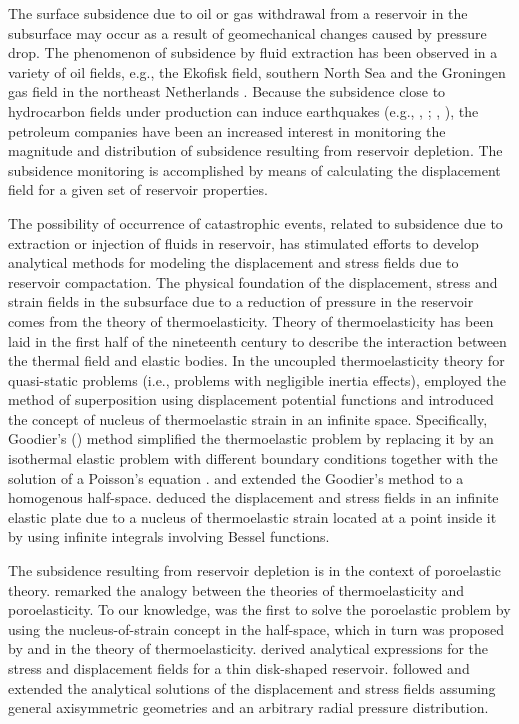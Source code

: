\documentclass[journal abbreviation, manuscript]{copernicus}
\begin{document}
\introduction  %
The surface subsidence due to oil or gas withdrawal from a reservoir in the subsurface may occur as a result of geomechanical changes caused by pressure drop.
The phenomenon of subsidence by fluid extraction  has been observed in a variety of oil fields, e.g., the Ekofisk field, southern North Sea \citep{Borges2020} and the Groningen gas field in the northeast Netherlands \citep{vanThienen-visser&Fokker17}.
Because the subsidence close to hydrocarbon fields under production can induce earthquakes (e.g., \citeauthor{Dahmetal15}, \citeyear{Dahmetal15}; \citeauthor{Grigolietal17}, \citeyear{Grigolietal17}), the petroleum companies  have been an increased interest in monitoring the magnitude and distribution of subsidence resulting from reservoir depletion.
The subsidence monitoring is accomplished by means of calculating the displacement field for a given set of  reservoir properties.

The possibility of occurrence of catastrophic events, related to subsidence due to extraction or injection of fluids in reservoir, has stimulated efforts to  develop analytical methods for modeling the displacement and stress fields due to reservoir compactation.
The physical foundation of the displacement, stress and strain fields in the subsurface due to a reduction of pressure in the reservoir comes from the theory of thermoelasticity.
Theory of thermoelasticity has been laid in the first half of the nineteenth century to describe the interaction between the thermal field and elastic bodies.
In the uncoupled thermoelasticity theory for quasi-static problems (i.e., problems with negligible inertia effects), \cite{Goodier37} employed the method of superposition using
displacement potential functions and introduced the  concept of nucleus of thermoelastic strain in an infinite space.
Specifically, Goodier’s (\citeyear{Goodier37}) method simplified the thermoelastic problem by replacing it by an isothermal elastic problem with different boundary conditions together with the solution of a Poisson’s equation \citep{Tao71}. 
\cite{Mindlin&Cheng50} and \cite{Sen51} extended the Goodier's method to a homogenous half-space.
\cite{Sharma56} deduced the displacement and stress fields in an infinite elastic plate due to a nucleus of thermoelastic strain located at a point inside it by using infinite integrals involving Bessel functions.

The subsidence resulting from reservoir depletion is in the context of poroelastic theory. 
\cite{Geertsma57} remarked the analogy between the theories of thermoelasticity and poroelasticity.
To our knowledge, \cite{Geertsma73} was the first to solve the poroelastic problem by using the nucleus-of-strain concept in the half-space, which in turn was proposed by \cite{Mindlin&Cheng50} and \cite{Sen51} in the theory of thermoelasticity.
\cite{Geertsma73} derived analytical expressions for the stress and displacement fields for a thin disk-shaped reservoir. 
\cite{Segall92} followed \cite{Geertsma73} and extended the analytical solutions of the displacement and stress fields assuming general axisymmetric geometries and an arbitrary radial pressure distribution. 
\end{document}
